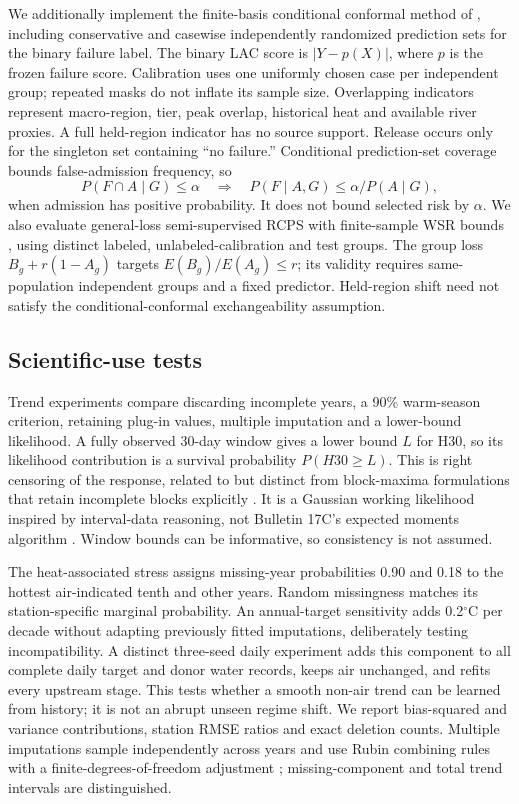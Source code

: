 \documentclass[draft,linenumbers]{agujournal2025}
\begin{document}
We additionally implement the finite-basis conditional conformal method of , including conservative and casewise independently randomized prediction sets for the binary failure label. The binary LAC score is $|Y-p(X)|$, where $p$ is the frozen failure score. Calibration uses one uniformly chosen case per independent group; repeated masks do not inflate its sample size. Overlapping indicators represent macro-region, tier, peak overlap, historical heat and available river proxies. A full held-region indicator has no source support. Release occurs only for the singleton set containing ``no failure.'' Conditional prediction-set coverage bounds false-admission frequency, so
\[
 P(F\cap A\mid G)\leq\alpha
 \quad\Longrightarrow\quad
 P(F\mid A,G)\leq\alpha/P(A\mid G),
\]
when admission has positive probability. It does not bound selected risk by $\alpha$. We also evaluate general-loss semi-supervised RCPS with finite-sample WSR bounds \cite{einbinder2025semi}, using distinct labeled, unlabeled-calibration and test groups. The group loss $B_g+r(1-A_g)$ targets $E(B_g)/E(A_g)\leq r$; its validity requires same-population independent groups and a fixed predictor. Held-region shift need not satisfy the conditional-conformal exchangeability assumption.

\subsection{Scientific-use tests}
Trend experiments compare discarding incomplete years, a 90\% warm-season criterion, retaining plug-in values, multiple imputation and a lower-bound likelihood. A fully observed 30-day window gives a lower bound $L$ for H30, so its likelihood contribution is a survival probability $P(H30\geq L)$. This is right censoring of the response, related to but distinct from block-maxima formulations that retain incomplete blocks explicitly \cite{simpson2026}. It is a Gaussian working likelihood inspired by interval-data reasoning, not Bulletin 17C's expected moments algorithm \cite{england2019}. Window bounds can be informative, so consistency is not assumed.

The heat-associated stress assigns missing-year probabilities 0.90 and 0.18 to the hottest air-indicated tenth and other years. Random missingness matches its station-specific marginal probability. An annual-target sensitivity adds 0.2$^{\circ}$C per decade without adapting previously fitted imputations, deliberately testing incompatibility. A distinct three-seed daily experiment adds this component to all complete daily target and donor water records, keeps air unchanged, and refits every upstream stage. This tests whether a smooth non-air trend can be learned from history; it is not an abrupt unseen regime shift. We report bias-squared and variance contributions, station RMSE ratios and exact deletion counts. Multiple imputations sample independently across years and use Rubin combining rules with a finite-degrees-of-freedom adjustment \cite{rubin1987,barnard1999,vanbuuren2018}; missing-component and total trend intervals are distinguished.
\end{document}
